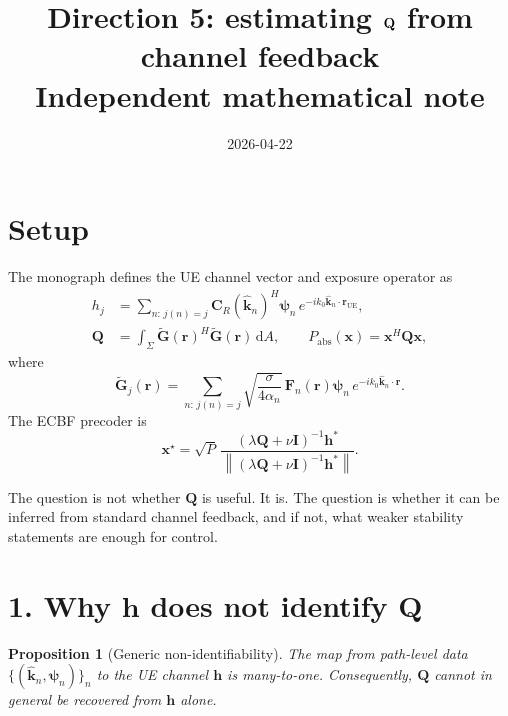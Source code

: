 \documentclass[11pt]{article}
\title{Direction 5: estimating $\QQ$ from channel feedback\\
\large Independent mathematical note}
\author{}
\date{2026-04-22}
\newtheorem{proposition}{Proposition}
\newcommand{\hh}{\mathbf{h}}
\newcommand{\QQ}{\mathbf{Q}}
\newcommand{\x}{\mathbf{x}}
\newcommand{\I}{\mathbf{I}}
\newcommand{\Gh}{\widetilde{\mathbf{G}}}
\newcommand{\psin}{\boldsymbol{\psi}}
\newcommand{\norm}[1]{\left\lVert #1 \right\rVert}
\newcommand{\dd}{\mathrm{d}}
\begin{document}
\maketitle

\section*{Setup}

The monograph defines the UE channel vector and exposure operator as
\begin{align}
  h_j
  &= \sum_{n:\,j(n)=j}
  \mathbf{C}_R(\hat{\mathbf{k}}_n)^H \psin_n\,
  e^{-ik_0\hat{\mathbf{k}}_n\cdot \mathbf{r}_{\mathrm{UE}}},
  \label{eq:h-note}
  \\
  \QQ
  &= \int_\Sigma \Gh(\mathbf{r})^H \Gh(\mathbf{r})\,\dd A,
  \qquad
  P_{\mathrm{abs}}(\x)=\x^H\QQ\x,
  \label{eq:Q-note}
\end{align}
where
\begin{equation}
  \Gh_j(\mathbf{r})
  = \sum_{n:\,j(n)=j}
  \sqrt{\frac{\sigma}{4\alpha_n}}\,
  \mathbf{F}_n(\mathbf{r})\psin_n\,
  e^{-ik_0\hat{\mathbf{k}}_n\cdot \mathbf{r}}.
\end{equation}
The ECBF precoder is
\begin{equation}
  \x^\star
  = \sqrt{P}\,
  \frac{(\lambda \QQ + \nu \I)^{-1}\hh^*}
  {\norm{(\lambda \QQ + \nu \I)^{-1}\hh^*}}.
\end{equation}

The question is not whether $\QQ$ is useful. It is. The question is whether
it can be inferred from standard channel feedback, and if not, what weaker
stability statements are enough for control.

\section*{1. Why $\hh$ does not identify $\QQ$}

\begin{proposition}[Generic non-identifiability]
The map from path-level data $\{(\hat{\mathbf{k}}_n,\psin_n)\}_n$ to the UE
channel $\hh$ is many-to-one. Consequently, $\QQ$ cannot in general be
recovered from $\hh$ alone.
\end{proposition}
\end{document}
